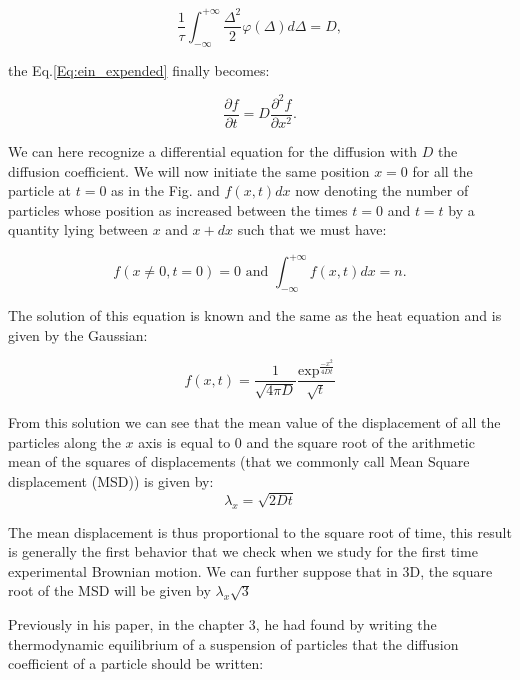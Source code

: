 \begin{equation}
	\frac{1}{\tau} \int_{-\infty}^{+\infty} \frac{\Delta^2}{2}\varphi(\Delta)d\Delta =D,
\end{equation}

the Eq.\ref{Eq:ein_expended} finally becomes:

\begin{equation}
	\frac{\partial f}{\partial t} = D \frac{\partial ^2 f}{\partial x ^2}.
\end{equation}

We can here recognize a differential equation for the diffusion with $D$ the diffusion coefficient. We will now initiate the same position $x=0$ for all the particle at $t=0$ as in the Fig. and $f(x,t)dx$ now denoting the number of particles whose position as increased between the times  $t=0$ and $t=t$  by a quantity lying between $x$ and $x + dx$ such that we must have:

\begin{equation}
	f(x \ne 0, t=0) = 0 \text{ and } \int_{-\infty}^{+\infty}f(x,t)dx = n.
\end{equation}

The solution of this equation is known and the same as the heat equation and is given by the Gaussian:


\begin{equation}
	f(x,t) = \frac{1}{\sqrt{4\pi D}} \frac{\mathrm{exp}^{\frac{-x^2}{4Dt}}}{\sqrt{t}}
\end{equation}

From this solution we can see that the mean value of the displacement of all the particles along the $x$ axis is equal to $0$ and the square root of the arithmetic mean of the squares of displacements (that we commonly call Mean Square displacement (\gls{MSD}))  is given by:
\begin{equation}
	\lambda _x = \sqrt{2Dt}
	\label{Eq:MSD_ein}
\end{equation}

The mean displacement is thus proportional to the square root of time, this result is generally the first behavior that we check when we study for the first time experimental Brownian motion. We can further suppose that in 3D, the square root of the \gls{MSD} will be given by $\lambda_x \sqrt{3}$

Previously in his paper, in the chapter 3, he had found by writing the thermodynamic equilibrium of a suspension of particles that the diffusion coefficient of a particle should be written:


